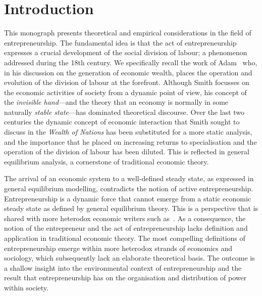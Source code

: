\setcounter{page}{1} 
\chapter{Introduction} 

This monograph presents theoretical and empirical considerations in the field of entrepreneurship. The fundamental idea is that the act of entrepreneurship expresses a crucial development of the social division of labour; a phenomenon addressed during the 18th century. We specifically recall the work of Adam~\cite{Smith1776} who, in his discussion on the generation of economic wealth, places the operation and evolution of the division of labour at the forefront. Although Smith focusses on the economic activities of society from a dynamic point of view, his concept of the \emph{invisible hand}---and the theory that an economy is normally in some naturally \emph{stable state}---has dominated theoretical discourse. Over the last two centuries the dynamic concept of economic interaction that Smith sought to discuss in the \emph{Wealth of Nations} has been substituted for a more static analysis, and the importance that he placed on increasing returns to specialisation and the operation of the division of labour has been diluted. This is reflected in general equilibrium analysis, a cornerstone of traditional economic theory.

The arrival of an economic system to a well-defined steady state, as expressed in general equilibrium modelling, contradicts the notion of active entrepreneurship. Entrepreneurship is a dynamic force that cannot emerge from a static economic steady state as defined by general equilibrium theory. This is a perspective that is shared with more heterodox economic writers such as~\citet{Schumpeter1942}. As a consequence, the notion of the entrepreneur and the act of entrepreneurship lacks definition and application in traditional economic theory. The most compelling definitions of entrepreneurship emerge within more heterodox strands of economics and sociology, which subsequently lack an elaborate theoretical basis. The outcome is a shallow insight into the environmental context of entrepreneurship and the result that entrepreneurship has on the organisation and distribution of power within society.

